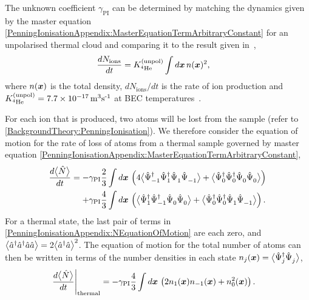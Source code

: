The unknown coefficient $\gamma_\text{PI}$ can be determined by matching the dynamics given by the master equation \eqref{PenningIonisationAppendix:MasterEquationTermArbitraryConstant} for an unpolarised thermal cloud and comparing it to the result given in~\citep{Stas:2006kx},
\begin{align}
    \frac{d N_\text{ions}}{d t} &= \Kunpol \int d \vect{x}\, n(\vect{x})^2,
    \label{PenningIonisationAppendix:ThermalSampleStas}
\end{align}
where $n(\bm{x})$ is the total density, $dN_\text{ions}/dt$ is the rate of ion production and $\Kunpol = \unit[7.7 \times 10^{-17}]{m\textsuperscript{3}s\textsuperscript{-1}}$ at BEC temperatures~\citep{Stas:2006kx}.

For each ion that is produced, two atoms will be lost from the sample (refer to \eqref{BackgroundTheory:PenningIonisation}). We therefore consider the equation of motion for the rate of loss of atoms from a thermal sample governed by master equation \eqref{PenningIonisationAppendix:MasterEquationTermArbitraryConstant},
\begin{align}
    \label{PenningIonisationAppendix:NEquationOfMotion}
    \begin{split}
        \frac{d \mean{\hat{N}}}{d t} &= - \gamma_\text{PI} \frac{2}{3}\int d \vect{x}\, \left(4 \mean{\hat{\Psi}_{-1}^\dagger \hat{\Psi}_1^\dagger \hat{\Psi}_1^{\phantom{\dagger}}\hat{\Psi}_{-1}^{\phantom{\dagger}}} + \mean{\hat{\Psi}_0^\dagger \hat{\Psi}_0^\dagger \hat{\Psi}_0^{\phantom{\dagger}} \hat{\Psi}_0^{\phantom{\dagger}}}\right)\\
        &\relphantom{=} + \gamma_\text{PI} \frac{4}{3}\int d \vect{x}\, \left( \mean{\hat{\Psi}_1^\dagger \hat{\Psi}_{-1}^\dagger \hat{\Psi}_0^{\phantom{\dagger}} \hat{\Psi}_0^{\phantom{\dagger}}} +  \mean{\hat{\Psi}_0^\dagger \hat{\Psi}_0^\dagger \hat{\Psi}_1^{\phantom{\dagger}} \hat{\Psi}_{-1}^{\phantom{\dagger}}} \right).
    \end{split}
\end{align}
For a thermal state, the last pair of terms in \eqref{PenningIonisationAppendix:NEquationOfMotion} are each zero, and ${\big<\hat{a}^\dagger \hat{a}^\dagger \hat{a} \hat{a}\big>} = 2 {\big<\hat{a}^\dagger \hat{a}\big>}^2$. The equation of motion for the total number of atoms can then be written in terms of the number densities in each state $n_j(\bm{x}) = {\big<\hat{\Psi}_j^\dagger \hat{\Psi}_j^{\phantom{\dagger}}\big>}$,
\begin{align}
    \left.\frac{d {\big<\hat{N}\big>}}{dt} \right|_\text{thermal} &= - \gamma_\text{PI} \frac{4}{3} \int d \bm{x}\, \left(2 n_1(\bm{x}) n_{-1}(\bm{x}) + n_0^2(\bm{x})\right).
\end{align}
